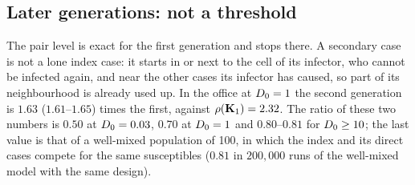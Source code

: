 \subsection{Later generations: not a threshold}\label{s5_pair:sec:threshold}

The pair level is exact for the first generation and stops there. A secondary case is not a lone index case:
it starts in or next to the cell of its infector, who cannot be infected again, and near the other cases its
infector has caused, so part of its neighbourhood is already used up. In the office at $D_0=1$ the second
generation is $1.63$ ($1.61$--$1.65$) times the first, against $\rho(\mathbf{K}_1)=2.32$. The ratio of these two
numbers is $0.50$ at $D_0=0.03$, $0.70$ at $D_0=1$ and $0.80$--$0.81$ for $D_0\ge10$; the last value is that
of a well-mixed population of 100, in which the index and its direct cases compete for the same susceptibles
($0.81$ in $200{,}000$ runs of the well-mixed model with the same design).


